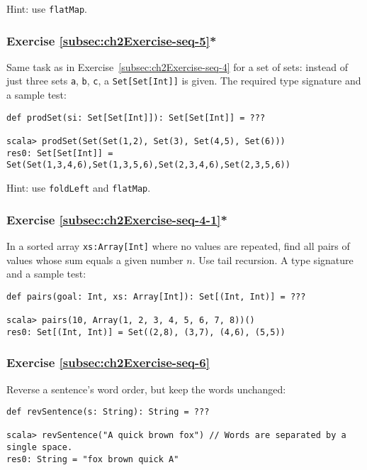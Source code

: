 Hint: use \lstinline!flatMap!.

\subsubsection{Exercise \label{subsec:ch2Exercise-seq-5}\ref{subsec:ch2Exercise-seq-5}{*}}

Same task as in Exercise~\ref{subsec:ch2Exercise-seq-4} for a set
of sets: instead of just three sets \lstinline!a!, \lstinline!b!,
\lstinline!c!, a \lstinline!Set[Set[Int]]! is given. The required
type signature and a sample test:
\begin{lstlisting}
def prodSet(si: Set[Set[Int]]): Set[Set[Int]] = ???

scala> prodSet(Set(Set(1,2), Set(3), Set(4,5), Set(6)))
res0: Set[Set[Int]] = Set(Set(1,3,4,6),Set(1,3,5,6),Set(2,3,4,6),Set(2,3,5,6))
\end{lstlisting}

Hint: use \lstinline!foldLeft! and \lstinline!flatMap!.

\subsubsection{Exercise \label{subsec:ch2Exercise-seq-4-1}\ref{subsec:ch2Exercise-seq-4-1}{*}}

In a sorted array \lstinline!xs:Array[Int]! where no values are repeated,
find all pairs of values whose sum equals a given number $n$. Use
tail recursion. A type signature and a sample test:
\begin{lstlisting}
def pairs(goal: Int, xs: Array[Int]): Set[(Int, Int)] = ???

scala> pairs(10, Array(1, 2, 3, 4, 5, 6, 7, 8))()
res0: Set[(Int, Int)] = Set((2,8), (3,7), (4,6), (5,5))
\end{lstlisting}


\subsubsection{Exercise \label{subsec:ch2Exercise-seq-6}\ref{subsec:ch2Exercise-seq-6}}

Reverse a sentence\textsf{'}s word order, but keep the words unchanged:
\begin{lstlisting}
def revSentence(s: String): String = ???

scala> revSentence("A quick brown fox") // Words are separated by a single space.
res0: String = "fox brown quick A"
\end{lstlisting}


